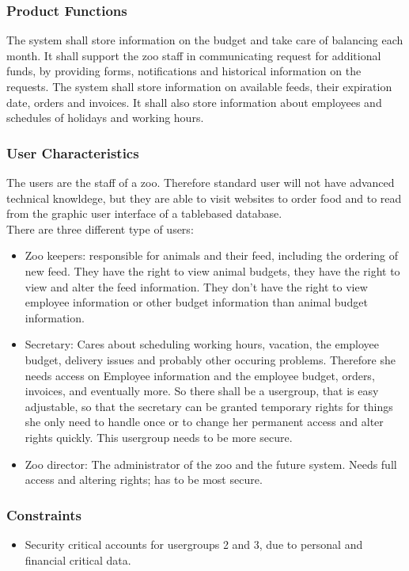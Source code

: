 	\subsubsection{Product Functions}
		The system shall store information on the budget and take care of balancing each month. It shall support the zoo staff in communicating request for additional funds, by providing forms, notifications and historical information on the requests. The system shall store information on available feeds, their expiration date, orders and invoices. It shall also store information about employees and schedules of holidays and working hours.

	\subsubsection{User Characteristics}
		The users are the staff of a zoo. Therefore standard user will not have advanced technical knowldege, but they are able to visit websites to order food and to read from the graphic user interface of a tablebased database. \\
		There are three different type of users: \\
		\begin{itemize}
			\item Zoo keepers: responsible for animals and their feed, including the ordering of new feed. They have the right to view animal budgets, they have the right to view and alter the feed information. They don't have the right to view employee information or other budget information than animal budget information. \\
			\item Secretary: Cares about scheduling working hours, vacation, the employee budget, delivery issues and probably other occuring problems. Therefore she needs access on Employee information and the employee budget, orders, invoices, and eventually more. So there shall be a usergroup, that is easy adjustable, so that the secretary can be granted temporary rights for things she only need to handle once or to change her permanent access and alter rights quickly. This usergroup needs to be more secure. \\
		 	\item Zoo director: The administrator of the zoo and the future system. Needs full access and altering rights; has to be most secure.
		\end{itemize}

	\subsubsection{Constraints}
		\begin{itemize}
			\item Security critical accounts for usergroups 2 and 3, due to personal and financial critical data.
		\end{itemize}


